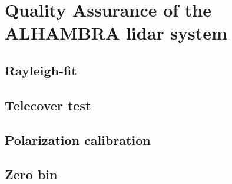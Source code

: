 \chapter{Quality Assurance of the ALHAMBRA lidar system}
\label{sect::devs01_chapter3}

\section{Rayleigh-fit}
\label{sect::devs01_chapter3_ray}

\section{Telecover test}
\label{sect::devs01_chapter3_telecover}

\section{Polarization calibration}
\label{sect::devs01_chapter3_depo}

\section{Zero bin}
\label{sect::devs01_chapter3_zerobin}